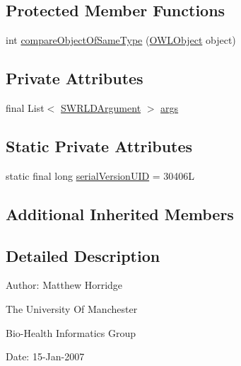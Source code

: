 \subsection*{Protected Member Functions}
\begin{DoxyCompactItemize}
\item 
int \hyperlink{classuk_1_1ac_1_1manchester_1_1cs_1_1owl_1_1owlapi_1_1_s_w_r_l_built_in_atom_impl_abc0737f039a4264d862d08daad12de3a}{compare\-Object\-Of\-Same\-Type} (\hyperlink{interfaceorg_1_1semanticweb_1_1owlapi_1_1model_1_1_o_w_l_object}{O\-W\-L\-Object} object)
\end{DoxyCompactItemize}
\subsection*{Private Attributes}
\begin{DoxyCompactItemize}
\item 
final List$<$ \hyperlink{interfaceorg_1_1semanticweb_1_1owlapi_1_1model_1_1_s_w_r_l_d_argument}{S\-W\-R\-L\-D\-Argument} $>$ \hyperlink{classuk_1_1ac_1_1manchester_1_1cs_1_1owl_1_1owlapi_1_1_s_w_r_l_built_in_atom_impl_a4e5b8d2530722a62574df36531152156}{args}
\end{DoxyCompactItemize}
\subsection*{Static Private Attributes}
\begin{DoxyCompactItemize}
\item 
static final long \hyperlink{classuk_1_1ac_1_1manchester_1_1cs_1_1owl_1_1owlapi_1_1_s_w_r_l_built_in_atom_impl_a5856c225d8f3f5349fe4fca9a3ff47a3}{serial\-Version\-U\-I\-D} = 30406\-L
\end{DoxyCompactItemize}
\subsection*{Additional Inherited Members}


\subsection{Detailed Description}
Author\-: Matthew Horridge\par
 The University Of Manchester\par
 Bio-\/\-Health Informatics Group\par
 Date\-: 15-\/\-Jan-\/2007\par
\par
 

